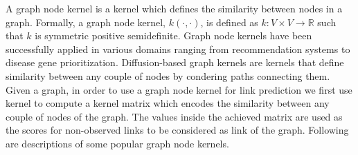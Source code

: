\documentclass{article}
\begin{document}
A graph node kernel is a kernel which defines the similarity between nodes in a graph. Formally, a graph node kernel, $k(\cdot,\cdot)$, is defined as $k: V \times V \longrightarrow \mathbb{R}$ such that $k$ is symmetric positive semidefinite. Graph node kernels have been successfully applied in various domains ranging from recommendation systems to disease gene prioritization. Diffusion-based graph kernels are kernels that define similarity between any couple of nodes by condering paths connecting them.
Given a graph, in order to use a graph node kernel for link prediction we first use kernel to compute a kernel matrix which encodes the similarity between any couple of nodes of the graph. The values inside the achieved matrix are used as the scores for non-observed links to be considered as link of the graph. Following are descriptions of some popular graph node kernels.
\end{document}
